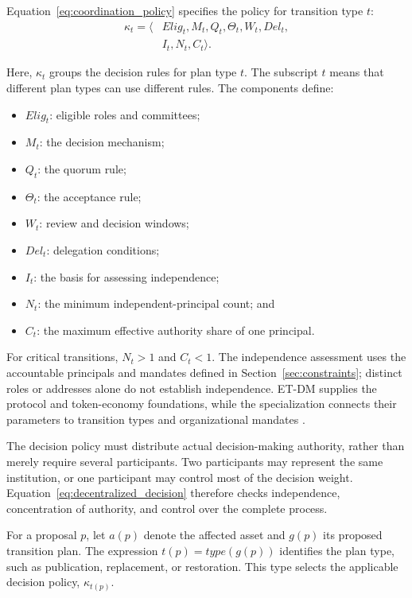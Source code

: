 \documentclass[journal]{IEEEtran}
\begin{document}
Equation~\ref{eq:coordination_policy} specifies the policy
for transition type $t$:
\begin{equation}
\label{eq:coordination_policy}
\begin{aligned}
\kappa_t=\langle&
Elig_t,M_t,Q_t,\Theta_t,W_t,Del_t,\\
&I_t,N_t,C_t\rangle.
\end{aligned}
\end{equation}

Here, $\kappa_t$ groups the decision rules for plan type $t$.
The subscript $t$ means that different plan types can use different
rules. The components define:
\begin{itemize}
    \item $Elig_t$: eligible roles and committees;
    \item $M_t$: the decision mechanism;
    \item $Q_t$: the quorum rule;
    \item $\Theta_t$: the acceptance rule;
    \item $W_t$: review and decision windows;
    \item $Del_t$: delegation conditions;
    \item $I_t$: the basis for assessing independence;
    \item $N_t$: the minimum independent-principal count; and
    \item $C_t$: the maximum effective authority share
    of one principal.
\end{itemize}

For critical transitions, $N_t>1$ and $C_t<1$.
The independence assessment uses the accountable principals
and mandates defined in Section~\ref{sec:constraints};
distinct roles or addresses alone do not establish independence.
ET-DM supplies the protocol and token-economy foundations,
while the specialization connects their parameters to
transition types and organizational mandates
\cite{Avanzo2025ETDM,Avanzo2026DAOModCoordination}.

The decision policy must distribute actual decision-making
authority, rather than merely require several participants.
Two participants may represent the same institution, or one
participant may control most of the decision weight.
Equation~\ref{eq:decentralized_decision} therefore checks
independence, concentration of authority, and control over
the complete process.

For a proposal $p$, let $a(p)$ denote the affected asset
and $g(p)$ its proposed transition plan. The expression
$t(p)=type(g(p))$ identifies the plan type, such as publication,
replacement, or restoration. This type selects the applicable
decision policy, $\kappa_{t(p)}$.
\end{document}
